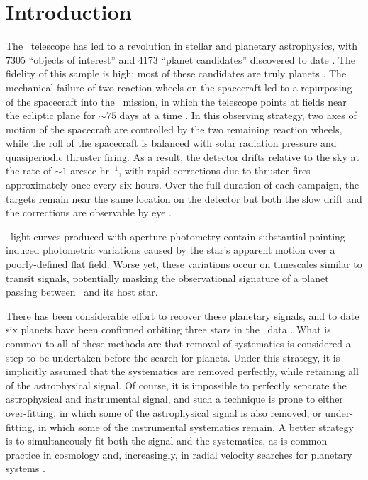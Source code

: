 

\section{Introduction}
The \kep\ telescope \citep{Borucki10} has led to a revolution in stellar and planetary
astrophysics, with 7305 ``objects of interest'' and 4173 ``planet candidates''
discovered to date \citep{Borucki11a, Borucki11b, Batalha13, Burke14, Rowe15, Mullally15}.
The fidelity of this sample is high: most of these candidates are truly planets
\citep{Morton11b, Fressin13, Desert15}.
The mechanical failure of two reaction wheels on the spacecraft led to a repurposing
of the spacecraft into the \KT\ mission, in which the telescope points at
fields near the ecliptic plane for $\sim 75$ days at a time \citep{Howell14}.
In this observing strategy, two axes of motion of the spacecraft are
controlled by the two remaining reaction wheels, while the roll of the
spacecraft is balanced with solar radiation pressure and quasiperiodic
thruster firing.
As a result, the detector drifts relative to the sky
at the rate of $\sim 1$ arcsec hr$^{-1}$, with rapid corrections due to thruster fires
approximately once every six hours.
Over the full duration of each campaign, the targets remain near the
same location on the detector but both the slow drift and the corrections are
observable by eye \citep{Barentsen15}.

\KT\ light curves produced with aperture photometry contain substantial pointing-induced
photometric variations caused by the star's apparent motion over a poorly-defined flat
field.
Worse yet, these variations occur on timescales similar to transit signals, potentially
masking the observational signature of a planet passing between \kep\ and its host star.

There has been considerable effort to recover these planetary signals, and to date six
planets have been confirmed orbiting three stars in the \KT\ data
\citep{Armstrong15b, Crossfield15, Vanderburg15}.
What is common to all of these methods are that removal of systematics is considered a
step to be undertaken before the search for planets.
Under this strategy, it is implicitly assumed that the systematics are removed perfectly,
while retaining all of the astrophysical signal.
Of course, it is impossible to perfectly separate the astrophysical and instrumental
signal, and such a technique is prone to either over-fitting, in which some of the
astrophysical signal is also removed, or under-fitting, in which some
of the instrumental systematics remain.
A better strategy is to simultaneously fit both the signal and the systematics, as is common
practice in cosmology and, increasingly, in radial velocity searches for planetary systems
\citep[e.g.][]{Ferreira00, Boisse11, Haywood14, Grunblatt15}.

